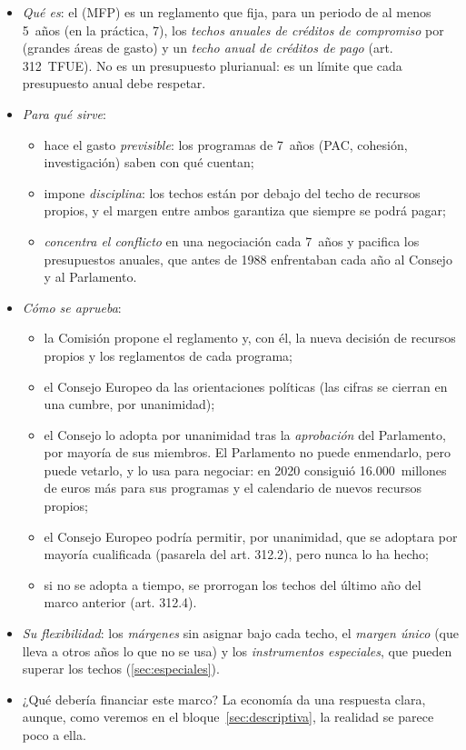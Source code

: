 \documentclass[11pt]{article}
\begin{document}
\begin{itemize}
\item \emph{Qué es}: el  (MFP) es un reglamento que fija, para un periodo de al menos 5~años (en la práctica, 7), los \emph{techos anuales de créditos de compromiso} por  (grandes áreas de gasto) y un \emph{techo anual de créditos de pago} (art. 312~TFUE). No es un presupuesto plurianual: es un límite que cada presupuesto anual debe respetar.
\item \emph{Para qué sirve}:
  \begin{itemize}
  \item hace el gasto \emph{previsible}: los programas de 7~años (PAC, cohesión, investigación) saben con qué cuentan;
  \item impone \emph{disciplina}: los techos están por debajo del techo de recursos propios, y el margen entre ambos garantiza que siempre se podrá pagar;
  \item \emph{concentra el conflicto} en una negociación cada 7~años y pacifica los presupuestos anuales, que antes de 1988 enfrentaban cada año al Consejo y al Parlamento.
  \end{itemize}
\item \emph{Cómo se aprueba}:
  \begin{itemize}
  \item la Comisión propone el reglamento y, con él, la nueva decisión de recursos propios y los reglamentos de cada programa;
  \item el Consejo Europeo da las orientaciones políticas (las cifras se cierran en una cumbre, por unanimidad);
  \item el Consejo lo adopta por unanimidad tras la \emph{aprobación} del Parlamento, por mayoría de sus miembros. El Parlamento no puede enmendarlo, pero puede vetarlo, y lo usa para negociar: en 2020 consiguió 16.000~millones de euros más para sus programas y el calendario de nuevos recursos propios;
  \item el Consejo Europeo podría permitir, por unanimidad, que se adoptara por mayoría cualificada (pasarela del art. 312.2), pero nunca lo ha hecho;
  \item si no se adopta a tiempo, se prorrogan los techos del último año del marco anterior (art. 312.4).
  \end{itemize}
\item \emph{Su flexibilidad}: los \emph{márgenes} sin asignar bajo cada techo, el \emph{margen único} (que lleva a otros años lo que no se usa) y los \emph{instrumentos especiales}, que pueden superar los techos (\ref{sec:especiales}).
\item ¿Qué debería financiar este marco? La economía da una respuesta clara, aunque, como veremos en el bloque~\ref{sec:descriptiva}, la realidad se parece poco a ella.
\end{itemize}
\end{document}
